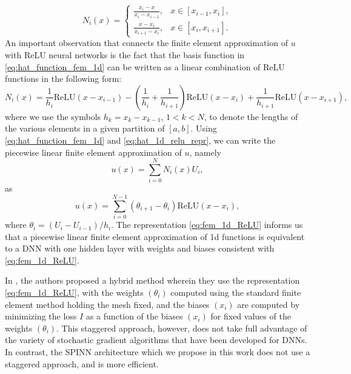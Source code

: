 \documentclass[12pt]{article}
\begin{document}
\begin{equation} \label{eq:hat_function_fem_1d}
N_i(x) = \begin{cases}
\frac{x_i - x}{x_i - x_{i-1}}, & x \in [x_{i-1},x_i],\\
\frac{x - x_i}{x_{i+1} - x_i}, & x \in [x_i, x_{i+1}].
\end{cases}
\end{equation}
An important observation that connects the finite element approximation of $u$ with ReLU neural networks is the fact that the basis function in \eqref{eq:hat_function_fem_1d} can be written as a linear combination of ReLU functions in the following form:
\begin{equation} \label{eq:hat_1d_relu_repr}
N_i(x) = \frac{1}{h_i}\text{ReLU}(x - x_{i-1}) - \left(\frac{1}{h_i} + \frac{1}{h_{i+1}}\right)\text{ReLU}(x - x_i) + \frac{1}{h_{i+1}}\text{ReLU}(x - x_{i+1}),
\end{equation}
where we use the symbols $h_k = x_{k} - x_{k-1}$, $1 < k < N$, to denote the lengths of the various elements in a given partition of $[a,b]$. Using \eqref{eq:hat_function_fem_1d} and \eqref{eq:hat_1d_relu_repr}, we can write the piecewise linear finite element approximation of $u$, namely
\begin{equation} \label{eq:fem_approx_1d}
u(x) = \sum_{i=0}^N N_i(x) U_i,
\end{equation}
as
\begin{equation} \label{eq:fem_1d_ReLU}
u(x) = \sum_{i=0}^{N - 1} (\theta_{i+1} - \theta_i) \text{ReLU}(x - x_i),
\end{equation}
where $\theta_i = (U_i - U_{i-1})/h_i$. The representation \eqref{eq:fem_1d_ReLU} informs us that a piecewise linear finite element approximation of 1d functions is equivalent to a DNN with one hidden layer with weights and biases consistent with \eqref{eq:fem_1d_ReLU}.

In \cite{HLXZ2020}, the authors proposed a hybrid method wherein they use the representation \eqref{eq:fem_1d_ReLU}, with the weights $(\theta_i)$ computed using the standard finite element method holding the mesh fixed, and the biases $(x_i)$ are computed by minimizing the loss $I$ as a function of the biases $(x_i)$ for fixed values of the weights $(\theta_i)$. This staggered approach, however, does not take full advantage of the variety of stochastic gradient algorithms that have been developed for DNNs. In contrast, the SPINN architecture which we propose in this work does not use a staggered approach, and is more efficient.
\end{document}

